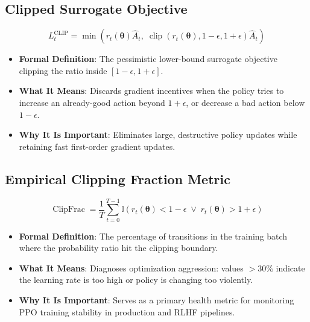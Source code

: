\documentclass[11pt,a4paper]{article}
\theoremstyle{definition}
\begin{document}
\subsection{Clipped Surrogate Objective}
{\boldmath
\begin{equation}
L_t^{\text{CLIP}} = \min\left( r_t(\boldsymbol{\theta}) \widehat{A}_t, \; \operatorname{clip}(r_t(\boldsymbol{\theta}), 1 - \epsilon, 1 + \epsilon) \widehat{A}_t \right)
\end{equation}
}
\begin{itemize}
    \item \textbf{Formal Definition}: The pessimistic lower-bound surrogate objective clipping the ratio inside $[1 - \epsilon, 1 + \epsilon]$.
    \item \textbf{What It Means}: Discards gradient incentives when the policy tries to increase an already-good action beyond $1 + \epsilon$, or decrease a bad action below $1 - \epsilon$.
    \item \textbf{Why It Is Important}: Eliminates large, destructive policy updates while retaining fast first-order gradient updates.
\end{itemize}

\subsection{Empirical Clipping Fraction Metric}
{\boldmath
\begin{equation}
\operatorname{ClipFrac} = \frac{1}{T} \sum_{t=0}^{T-1} \mathbb{I}\left( r_t(\boldsymbol{\theta}) < 1 - \epsilon \;\lor\; r_t(\boldsymbol{\theta}) > 1 + \epsilon \right)
\end{equation}
}
\begin{itemize}
    \item \textbf{Formal Definition}: The percentage of transitions in the training batch where the probability ratio hit the clipping boundary.
    \item \textbf{What It Means}: Diagnoses optimization aggression: values $> 30\%$ indicate the learning rate is too high or policy is changing too violently.
    \item \textbf{Why It Is Important}: Serves as a primary health metric for monitoring PPO training stability in production and RLHF pipelines.
\end{itemize}
\end{document}
